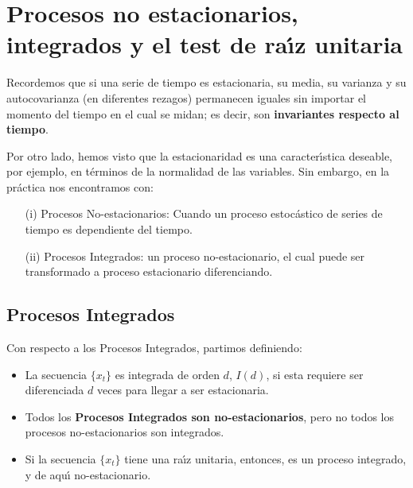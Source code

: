 

\section{Procesos no estacionarios, integrados y el test de ra\'{\i}z unitaria}

Recordemos que si una serie de tiempo es estacionaria, su media, su varianza y su autocovarianza (en diferentes rezagos) permanecen iguales sin importar el momento del tiempo en el cual se midan; es decir, son \textbf{invariantes respecto al tiempo}.
\par
Por otro lado, hemos visto que la estacionaridad es una caracter\'{\i}stica deseable, por ejemplo, en t\'erminos de la normalidad de las variables. Sin embargo, en la pr\'actica nos encontramos con:
\par
\begin{itemize}
	\item[(i)] Procesos No-estacionarios: Cuando un proceso estoc\'astico de series de tiempo es dependiente del tiempo.
	\item[(ii)] Procesos Integrados: un proceso no-estacionario, el cual puede ser transformado a proceso estacionario diferenciando.
\end{itemize}


\subsection{Procesos Integrados}

Con respecto a los Procesos Integrados, partimos definiendo:
	\begin{itemize}
		\item La secuencia $\{x_t\}$ es integrada de orden $d$, $I(d)$, si esta requiere ser diferenciada $d$ veces para llegar a ser estacionaria.
		\item Todos los \textbf{Procesos Integrados son no-estacionarios}, pero no todos los procesos no-estacionarios son integrados.
		\item Si la secuencia $\{x_t\}$  tiene una ra\'{\i}z unitaria, entonces, es un proceso integrado, y de aqu\'{\i} no-estacionario.
	\end{itemize}
%

